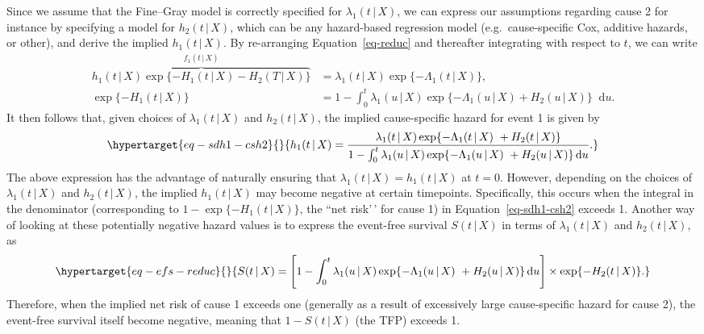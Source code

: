 \documentclass[
  letterpaper,
  DIV=11,
  numbers=noendperiod]{scrreprt}
\newcommand{\given}{\,|\,}
\newcommand\diff{\mathop{}\!\mathrm{d}}
\begin{document}
Since we assume that the Fine--Gray model is correctly specified for
\(\lambda_1(t \given X)\), we can express our assumptions regarding
cause 2 for instance by specifying a model for \(h_2(t \given X)\),
which can be any hazard-based regression model (e.g.~cause-specific Cox,
additive hazards, or other), and derive the implied \(h_1(t \given X)\).
By re-arranging Equation~\ref{eq-reduc} and thereafter integrating with
respect to \(t\), we can write
\begin{align*} %
    \overbrace{h_1(t \given X)\exp\{-H_1(t \given X)- H_2(T \given X)\}}^{f_1(t \given X)} &= \lambda_1(t \given X)\exp\{-\Lambda_1(t \given X)\}, \\
    \exp\{-H_1(t \given X)\} &= 1 -\int_{0}^{t} \lambda_1(u \given X)\exp\{-\Lambda_1(u \given X) + H_2(u \given X)\}\diff u.
\end{align*} It then follows that, given choices of
\(\lambda_1(t \given X)\) and \(h_2(t \given X)\), the implied
cause-specific hazard for event 1 is given by
\begin{equation}\protect\hypertarget{eq-sdh1-csh2}{}{
h_1(t \given X) = \frac{\lambda_1(t \given X)\exp\{-\Lambda_1(t \given X)\ + H_2(t \given X)\}}{1 -\int_{0}^{t} \lambda_1(u \given X)\exp\{-\Lambda_1(u \given X)\ + H_2(u \given X)\}\diff u}.
}\label{eq-sdh1-csh2}\end{equation} The above expression has the
advantage of naturally ensuring that
\(\lambda_1(t \given X) = h_1(t \given X)\) at \(t = 0\). However,
depending on the choices of \(\lambda_1(t \given X)\) and
\(h_2(t \given X)\), the implied \(h_1(t \given X)\) may become negative
at certain timepoints. Specifically, this occurs when the integral in
the denominator (corresponding to \(1 - \exp\{-H_1(t \given X)\}\), the
``net risk'\,' for cause 1) in Equation~\ref{eq-sdh1-csh2} exceeds 1.
Another way of looking at these potentially negative hazard values is to
express the event-free survival \(S(t \given X)\) in terms of
\(\lambda_1(t \given X)\) and \(h_2(t \given X)\), as
\begin{equation}\protect\hypertarget{eq-efs-reduc}{}{
S(t \given X) = \Bigg[1 -\int_{0}^{t} \lambda_1(u \given X)\exp\{-\Lambda_1(u \given X)\ + H_2(u \given X)\}\diff u\Bigg] \times \exp \{-H_2(t \given X)\}.
}\label{eq-efs-reduc}\end{equation} Therefore, when the implied net risk
of cause 1 exceeds one (generally as a result of excessively large
cause-specific hazard for cause 2), the event-free survival itself
become negative, meaning that \(1 - S(t \given X)\) (the TFP) exceeds 1.
\end{document}
